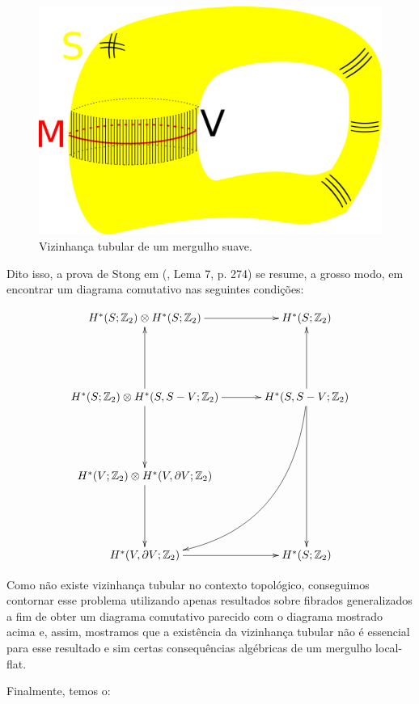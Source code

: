 \documentclass[12pt,oneside]{book} %
\newcommand{\Z}{\mathbb{Z}}
\newcommand{\tensor}{\otimes}
\begin{document}
\begin{figure}[h]
	\centering
	\includegraphics[scale=0.25]{viz_tub.pdf}
	\caption{Vizinhança tubular de um mergulho suave.}
\end{figure}

\par Dito isso, a prova de Stong em (\cite{stong}, Lema 7, p. 274) se resume, a grosso modo, em encontrar um diagrama comutativo nas seguintes condições:

$$ \xymatrix @C=0.5cm {
	H^{*}(S;\Z_{2})\tensor H^{*}(S;\Z_{2}) \ar[rr] & & H^{*}(S;\Z_{2}) \\
	& & \\		 
	H^{*}(S;\Z_{2})\tensor H^{*}(S,S-V;\Z_{2}) \ar[uu] \ar[rr] \ar[dd] & & H^{*}(S,S-V;\Z_{2}) \ar[uu] \ar@/^1.5cm/[lldddd] \ar[dddd] \\
	& & \\				
	H^{*}(V;\Z_{2})\tensor H^{*}(V,\partial V;\Z_{2}) \ar[dd] & & \\
	& & \\	
	H^{*}(V,\partial V;\Z_{2}) \ar[rr] & & H^{*}(S;\Z_{2})
} $$

\par Como não existe vizinhança tubular no contexto topológico, conseguimos contornar esse problema utilizando apenas resultados sobre fibrados generalizados a fim de obter um diagrama comutativo parecido com o diagrama mostrado acima e, assim, mostramos que a existência da vizinhança tubular não é essencial para esse resultado e sim certas consequências algébricas de um mergulho local-flat.

\par Finalmente, temos o:
\end{document}
